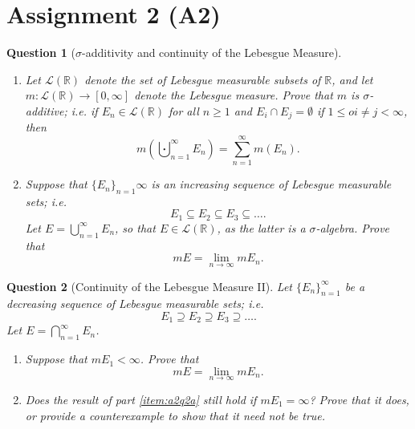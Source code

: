 \documentclass[notoc,notitlepage]{tufte-book}
\newtheorem{assgprob}{Question}[section]
\begin{document}
\newpage

\section{Assignment 2 (A2)}%
\label{sec:assignment_2}

\begin{assgprob}[$\sigma$-additivity and continuity of the Lebesgue Measure]
  \begin{enumerate}
    \item Let $\mathcal{L}(\mathbb{R})$ denote
      the set of Lebesgue measurable subsets of $\mathbb{R}$, and
      let $m : \mathcal{L}(\mathbb{R}) \to [0, \infty]$ denote
      the Lebesgue measure.
      Prove that $m$ is $\sigma$-additive; i.e. if
      $E_n \in \mathcal{L}(\mathbb{R})$ for all $n \geq 1$
      and $E_i \cap E_j = \emptyset$ if $1 \leq oi \neq j < \infty$, then
      \begin{equation*}
        m \left( \bigcupdot_{n=1}^{\infty} E_n \right)
        = \sum_{n=1}^{\infty} m(E_n).
      \end{equation*}

    \item Suppose that $\{ E_n \}_{n=1}{\infty}$ is an
      \textit{increasing} sequence of Lebesgue measurable sets; i.e.
      \begin{equation*}
        E_1 \subseteq E_2 \subseteq E_3 \subseteq \hdots.
      \end{equation*}
      Let $E = \bigcup_{n=1}^{\infty} E_n$, so that $E \in \mathcal{L}(\mathbb{R})$,
      as the latter is a $\sigma$-algebra.
      Prove that
      \begin{equation*}
        mE = \lim_{n \to \infty} mE_n.
      \end{equation*}
  \end{enumerate}
\end{assgprob}

\begin{assgprob}[Continuity of the Lebesgue Measure II]
  Let $\{ E_n \}_{n=1}^{\infty}$ be a \textit{decreasing} sequence
  of Lebesgue measurable sets; i.e.
  \begin{equation*}
    E_1 \supseteq E_2 \supseteq E_3 \supseteq \hdots.
  \end{equation*}
  Let $E = \bigcap_{n=1}^{\infty} E_n$.
  \begin{enumerate}
    \item \label{item:a2q2a}
      Suppose that $mE_1 < \infty$. Prove that
      \begin{equation*}
        mE = \lim_{n \to \infty} mE_n.
      \end{equation*}
    \item Does the result of part \ref{item:a2q2a} still hold if $mE_1 = \infty$?
      Prove that it does, or provide a counterexample to show
      that it need not be true.
  \end{enumerate}
\end{assgprob}
\end{document}
